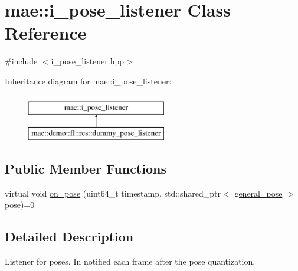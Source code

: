\hypertarget{classmae_1_1i__pose__listener}{\section{mae\-:\-:i\-\_\-pose\-\_\-listener Class Reference}
\label{classmae_1_1i__pose__listener}
}


{\ttfamily \#include $<$i\-\_\-pose\-\_\-listener.\-hpp$>$}

Inheritance diagram for mae\-:\-:i\-\_\-pose\-\_\-listener\-:\begin{figure}[H]
\begin{center}
\leavevmode
\includegraphics[height=2.000000cm]{classmae_1_1i__pose__listener}
\end{center}
\end{figure}
\subsection*{Public Member Functions}
\begin{DoxyCompactItemize}
\item 
virtual void \hyperlink{classmae_1_1i__pose__listener_a3fcf37297e2845ae8fec294f13f990be}{on\-\_\-pose} (uint64\-\_\-t timestamp, std\-::shared\-\_\-ptr$<$ \hyperlink{classmae_1_1general__pose}{general\-\_\-pose} $>$ pose)=0
\end{DoxyCompactItemize}


\subsection{Detailed Description}
Listener for poses. In notified each frame after the pose quantization. 

